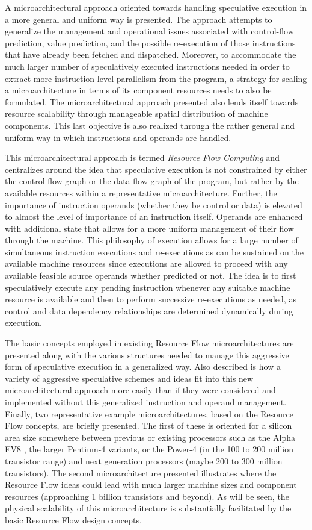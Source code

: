 \documentclass{book}
\begin{document}
A microarchitectural approach oriented towards handling
speculative execution in a more general and uniform way is
presented.  The approach
attempts to generalize the management and operational issues associated
with control-flow prediction, value prediction, and the possible
re-execution of those instructions that have already been fetched and
dispatched.  Moreover, to accommodate the much larger number
of speculatively executed instructions needed in order to extract more
instruction level parallelism from the program, a strategy for scaling a
microarchitecture in terms of its component resources needs to also be
formulated.  The microarchitectural approach presented 
also lends itself towards
resource scalability through manageable spatial distribution of machine
components.  This last objective is also realized through the rather
general and uniform way in which instructions and operands are
handled.

This microarchitectural approach is termed \textit{Resource Flow
Computing} and centralizes around the idea that speculative execution
is not constrained by either the control flow graph or the data flow
graph of the program, but rather by the available resources within a
representative microarchitecture.  Further, the importance
of instruction operands (whether they be control or data) 
is elevated to almost the
level of importance of an instruction itself.  
Operands are enhanced with additional
state that allows for a more uniform management of their flow through
the machine.  This philosophy of execution allows for a large number of
simultaneous instruction executions and re-executions as can be
sustained on the available machine resources since executions are
allowed to proceed with any available feasible source operands whether
predicted or not.  The idea is to first speculatively execute any
pending instruction whenever any suitable machine resource is available
and then to perform successive re-executions as needed, as control and
data dependency relationships are determined dynamically during
execution.

The basic concepts employed in existing Resource
Flow microarchitectures are presented along with the
various structures needed to manage this aggressive form
of speculative execution in a generalized way.  
Also described is how a
variety of aggressive speculative schemes and ideas fit into this new
microarchitectural approach more easily than if they were considered
and implemented without this generalized instruction and operand
management.
Finally, two representative example microarchitectures,
based on the Resource Flow concepts, are briefly presented.
The first of these is oriented for a silicon area size
somewhere between 
previous or existing processors such
as the Alpha EV8 \cite{Preston02}, the larger 
Pentium-4 \cite{hinton01pentium} variants, or the Power-4 (in
the 100 to 200 million transistor range) and next generation
processors (maybe 200 to 300 million transistors).
The second microarchitecture presented illustrates
where the Resource Flow ideas could lead with much larger
machine sizes and component resources (approaching 1 billion
transistors and beyond).
As will be seen, the physical scalability of this microarchitecture
is substantially facilitated by the basic Resource Flow design concepts.
%
%
\end{document}

